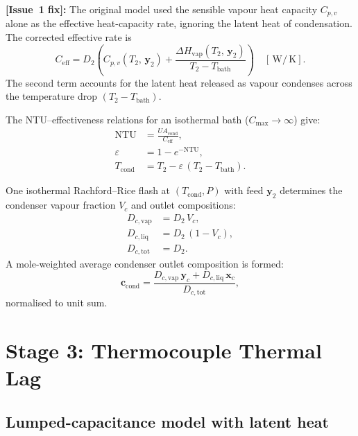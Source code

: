 \documentclass[11pt,letterpaper]{article}
\newcommand{\W}{\,\text{W}}
\newcommand{\K}{\,\text{K}}
\begin{document}
\textbf{[Issue~1 fix]:} The original model used the sensible vapour heat
capacity $C_{p,v}$ alone as the effective heat-capacity rate, ignoring
the latent heat of condensation.  The corrected effective rate is
\begin{equation}
  C_{\mathrm{eff}} = D_2 \left(C_{p,v}(T_2,\, \mathbf{y}_2)
    + \frac{\Delta H_{\mathrm{vap}}(T_2,\, \mathbf{y}_2)}{T_2 - T_{\mathrm{bath}}}\right)
  \quad [\W/\K].
  \label{eq:Ceff}
\end{equation}
The second term accounts for the latent heat released as vapour condenses
across the temperature drop $(T_2 - T_{\mathrm{bath}})$.

The NTU--effectiveness relations for an isothermal bath ($C_{\mathrm{max}} \to \infty$) give:
\begin{align}
  \mathrm{NTU} &= \frac{UA_{\mathrm{cond}}}{C_{\mathrm{eff}}}, \label{eq:NTU}\\
  \varepsilon   &= 1 - e^{-\mathrm{NTU}}, \label{eq:eps}\\
  T_{\mathrm{cond}} &= T_2 - \varepsilon\,(T_2 - T_{\mathrm{bath}}). \label{eq:Tcond}
\end{align}

One isothermal Rachford--Rice flash at $(T_{\mathrm{cond}}, P)$ with feed $\mathbf{y}_2$
determines the condenser vapour fraction $V_c$ and outlet compositions:
\begin{align}
  D_{c,\mathrm{vap}}  &= D_2\, V_c, \\
  D_{c,\mathrm{liq}}  &= D_2\,(1 - V_c), \\
  D_{c,\mathrm{tot}}  &= D_2.
\end{align}
A mole-weighted average condenser outlet composition is formed:
\begin{equation}
  \mathbf{c}_{\mathrm{cond}} = \frac{D_{c,\mathrm{vap}}\,\mathbf{y}_{c}
    + D_{c,\mathrm{liq}}\,\mathbf{x}_{c}}{D_{c,\mathrm{tot}}},
\end{equation}
normalised to unit sum.

\section{Stage 3: Thermocouple Thermal Lag}
\label{sec:stage3}

\subsection{Lumped-capacitance model with latent heat}
\end{document}
